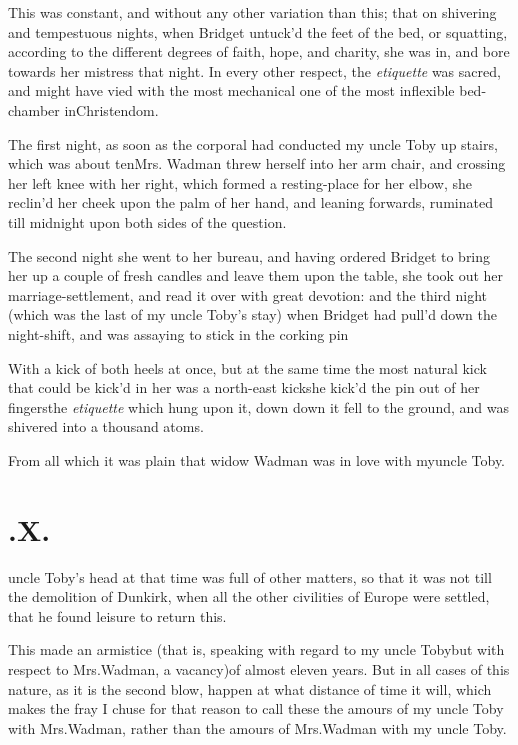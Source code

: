 \documentclass{article}
\begin{document}
This was constant, and without any other variation than this;
that on shivering and tempestuous nights, when Bridget
untuck’d the feet of the bed, \etc
{}
\tsk or squatting, according to the different degrees of faith, hope, and
charity, she was in, and bore towards her mistress that night. In
every other respect, the \textit{etiquette} was sacred, and might
have vied with the most mechanical one of the most inflexible
bed-chamber in\break Christendom.

The first night, as soon as the corporal had conducted my uncle
Toby up stairs, which was about ten\tsh Mrs.\break
Wadman threw herself into her arm chair, and crossing her
left knee with her right, which formed a resting-place for her
elbow, she reclin’d her cheek upon the palm of her hand, and
leaning forwards, ruminated till midnight upon both sides of
the question.

The second night she went to her bureau, and having ordered
Bridget to bring her up a couple of fresh candles and leave
them upon the table, she took out her marriage-settlement, and read
it over with great devotion: and the third night (which was the
last of my uncle Toby’s stay) when Bridget had
pull’d down the night-shift, and was assaying to stick in the
corking pin\tsh

\tsh With a kick of both heels at once, but at the same
time the most natural kick that could be kick’d in her
was a north-east kick\tsh she kick’d the pin out of her
fingers\tsh the \textit{etiquette} which hung upon it, down\tsh
down it fell to the ground, and was shivered into a thousand
atoms.

From all which it was plain that widow Wadman was in love
with my\break uncle Toby.

\section{.\enspace X.}

 uncle Toby’s head at
that time was full of other matters,\break
so that it was not till the
demolition of Dunkirk, when all the other civilities of
Europe were settled, that he found leisure to return
this.

This made an armistice (that is, speaking with regard to my uncle Toby\tsk but with
respect to Mrs.\@ Wadman, a vacancy)\tsk of almost eleven years. But in all cases of
this nature, as it is the second blow, happen at what distance of time it will,
which makes the fray\tsh\break 
I chuse for that reason to call these\break 
the amours of my uncle Toby with\break
Mrs.\@ Wadman, rather than the amours\break
of Mrs.\@ Wadman with my uncle Toby.
\end{document}
